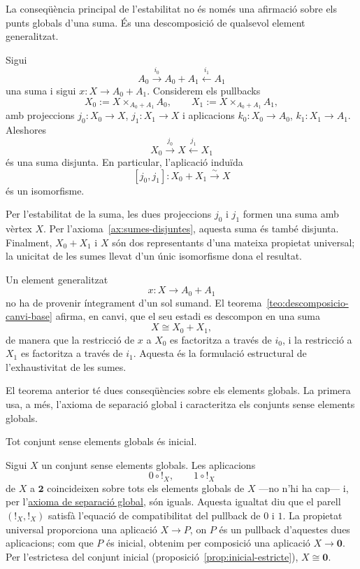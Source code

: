 La conseqüència principal de l'estabilitat no és només una afirmació
sobre els punts globals d'una suma. És una descomposició de qualsevol
element generalitzat.

\begin{teorema}\label{teo:descomposicio-canvi-base}
Sigui
\[
A_0\xrightarrow{i_0}A_0+A_1\xleftarrow{i_1}A_1
\]
una suma i sigui \(x:X\to A_0+A_1\). Considerem els pullbacks
\[
X_0:=X\times_{A_0+A_1}A_0,
\qquad
X_1:=X\times_{A_0+A_1}A_1,
\]
amb projeccions \(j_0:X_0\to X\), \(j_1:X_1\to X\) i aplicacions \(k_0:X_0\to A_0\), \(k_1:X_1\to A_1\). Aleshores
\[
X_0\xrightarrow{j_0}X\xleftarrow{j_1}X_1
\]
és una suma disjunta. En particular, l'aplicació induïda
\[
[j_0,j_1]:X_0+X_1\xrightarrow{\sim}X
\]
és un isomorfisme.
\end{teorema}

\begin{prova}
Per l'estabilitat de la suma, les dues projeccions
\(j_0\) i \(j_1\) formen una suma amb vèrtex \(X\). Per
l'axioma~\ref{ax:sumes-disjuntes}, aquesta suma és també disjunta.
Finalment, \(X_0+X_1\) i \(X\) són dos representants d'una mateixa
propietat universal; la unicitat de les sumes llevat d'un únic
isomorfisme dona el resultat.
\end{prova}

\begin{observacio}\label{obs:elements-generalitzats-suma}
Un element generalitzat
\[
x:X\to A_0+A_1
\]
no ha de provenir íntegrament d'un sol sumand. El
teorema~\ref{teo:descomposicio-canvi-base} afirma, en canvi, que el seu
estadi es descompon en una suma
\[
X\cong X_0+X_1,
\]
de manera que la restricció de \(x\) a \(X_0\) es factoritza a través
de \(i_0\), i la restricció a \(X_1\) es factoritza a través de
\(i_1\). Aquesta és la formulació estructural de l'exhaustivitat de les
sumes.
\end{observacio}

El teorema anterior té dues conseqüències sobre els elements globals. La primera usa, a més, l'axioma de separació global i caracteritza els conjunts sense elements globals.

\begin{lema}\label{lema:buit}
Tot conjunt sense elements globals és inicial.
\end{lema}

\begin{prova}
Sigui \(X\) un conjunt sense elements globals. Les aplicacions
\[
0\circ {!}_X,
\qquad
1\circ {!}_X
\]
de \(X\) a \(\mathbf2\) coincideixen sobre tots els elements globals de \(X\) ---no n'hi ha cap--- i, per l'\hyperref[ax:separacio-globals]{axioma de separació global}, són iguals. Aquesta igualtat diu que el parell \(({!}_X,{!}_X)\) satisfà l'equació de compatibilitat del pullback de \(0\) i \(1\). La propietat universal proporciona una aplicació \(X\to P\), on \(P\) és un pullback d'aquestes dues aplicacions; com que \(P\) és inicial, obtenim per composició una aplicació \(X\to\mathbf0\). Per l'estrictesa del conjunt inicial (proposició~\ref{prop:inicial-estricte}), \(X\cong\mathbf0\).
\end{prova}

